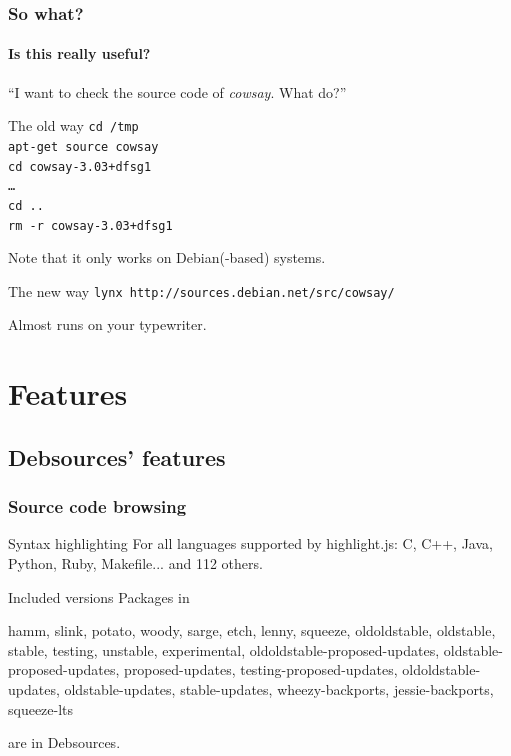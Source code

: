 \documentclass{beamer}
\begin{document}
\begin{frame}
  \frametitle{So what?}
  \framesubtitle{Is this really useful?}
  ``I want to check the source code of \textit{cowsay}. What do?''
  \begin{block}{The old way}
    \texttt{cd /tmp\\
      apt-get source cowsay\\
      cd cowsay-3.03+dfsg1\\
      \ldots\\
      cd ..\\
      rm -r cowsay-3.03+dfsg1
    }
  \end{block}
  \small{Note that it only works on Debian(-based) systems.}
  \pause
  \begin{block}{The new way}
    \texttt{lynx http://sources.debian.net/src/cowsay/}
  \end{block}
  \small{Almost runs on your typewriter.}
\end{frame}

\section{Features}

\subsection{Debsources' features}

\begin{frame}
  \frametitle{Source code browsing}
  \begin{block}{Syntax highlighting}
    For all languages supported by \alert{highlight.js}: C, C++,
    Java, Python, Ruby, Makefile... and 112 others.
  \end{block}
  \pause
  \begin{block}{Included versions}
    Packages in
    \begin{center}
      hamm, slink, potato, woody, sarge, etch, lenny, squeeze, oldoldstable,
      oldstable, stable, testing, unstable, experimental,
      oldoldstable-proposed-updates, oldstable-proposed-updates,
      proposed-updates, testing-proposed-updates, oldoldstable-updates,
      oldstable-updates, stable-updates, wheezy-backports, jessie-backports,
      squeeze-lts
    \end{center}
    are in Debsources.
  \end{block}
\end{frame}
\end{document}
